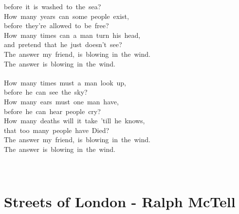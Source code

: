 \documentclass[]{book}
\let\stdsection\section
\renewcommand\section{\clearpage\stdsection}
\begin{document}
before~it~is~washed~to~the~sea?\\
How~many~years~can~some~people~exist,~\\
before~they're~allowed~to~be~free?~\\
How~many~times~can~a~man~turn~his~head,~\\
and~pretend~that~he~just~doesn't~see?\\
The~answer~my~friend,~is~blowing~in~the~wind.\\
The~answer~is~blowing~in~the~wind.\\
~\\
How~many~times~must~a~man~look~up,~\\
before~he~can~see~the~sky?\\
How~many~ears~must~one~man~have,~\\
before~he~can~hear~people~cry?\\
How~many~deaths~will~it~take~'till~he~knows,~\\
that~too~many~people~have~Died?\\
The~answer~my~friend,~is~blowing~in~the~wind.\\
The~answer~is~blowing~in~the~wind.\\
~\\
~\\

\hypertarget{streets-of-london---ralph-mctell}{%
\section{Streets of London - Ralph McTell}\label{streets-of-london---ralph-mctell}}
\end{document}
